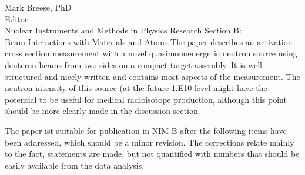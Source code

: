 \documentclass{letter} %
\begin{document}
\begin{letter}{Mark Breese, PhD \\
Editor \\
Nuclear Instruments and Methods in Physics Research Section B: \\
Beam Interactions with Materials and Atoms}
The paper describes an activation cross section measurement with a
novel quasimonoenergetic neutron source using deuteron beams from two sides on a compact target assembly. It is well structured and nicely written and contains most aspects of the measurement. The neutron intensity of this source (at the future 1.E10 level might have the potential
to be useful for medical radioisotope production, although this point should be more clearly made in the discussion section.

The paper ist suitable for publication in NIM B after the following items have been addressed, which should be a minor revision. The corrections relate mainly to the fact, statements are made, but not quantified with numbers that should be easily available from the data analysis.




\end{letter}
\end{document}
